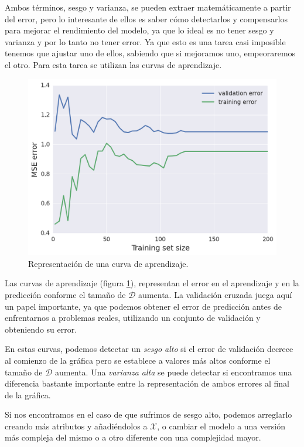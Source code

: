 Ambos términos, sesgo y varianza, se pueden extraer matemáticamente a partir del error, pero lo interesante de ellos es saber cómo detectarlos y compensarlos para mejorar el rendimiento del modelo, ya que lo ideal es no tener sesgo y varianza y por lo tanto no tener error. Ya que esto es una tarea casi imposible tenemos que ajustar uno de ellos, sabiendo que si mejoramos uno, empeoraremos el otro. Para esta tarea se utilizan las curvas de aprendizaje.

\begin{figure}[ht]
  \centering
  \includegraphics[width=120mm]{figures/ch_03/learning_curve_example.png}
  \caption{Representación de una curva de aprendizaje.}
  \label{fig:3.8}
\end{figure}

Las curvas de aprendizaje (figura \ref{fig:3.8}), representan el error en el aprendizaje y en la predicción conforme el tamaño de $\mathcal{D}$ aumenta. La validación cruzada juega aquí un papel importante, ya que podemos obtener el error de predicción antes de enfrentarnos a problemas reales, utilizando un conjunto de validación y obteniendo su error.

En estas curvas, podemos detectar un \emph{sesgo alto} si el error de validación decrece al comienzo de la gráfica pero se establece a valores más altos conforme el tamaño de $\mathcal{D}$ aumenta. Una \emph{varianza alta} se puede detectar si encontramos una diferencia bastante importante entre la representación de ambos errores al final de la gráfica.

Si nos encontramos en el caso de que sufrimos de sesgo alto, podemos arreglarlo creando más atributos y añadiéndolos a $\mathcal{X}$, o cambiar el modelo a una versión más compleja del mismo o a otro diferente con una complejidad mayor.

